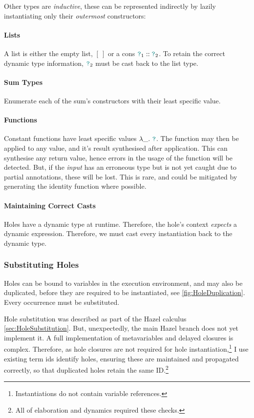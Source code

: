 Other types are \textit{inductive}, these can be represented indirectly by lazily instantiating only their \textit{outermost} constructors: 
 
\paragraph{Lists} A list is either the empty list, $[\ ]$ or a cons ${\color{teal}\texttt{?}}_1 :: {\color{teal}\texttt{?}}_2$. To retain the correct dynamic type information, ${\color{teal}\texttt{?}}_2$ must be cast back to the list type. 
\paragraph{Sum Types} Enumerate each of the sum's constructors with their least specific value.
\paragraph{Functions} Constant functions have least specific values $\lambda \_.\ {\color{teal}\texttt{?}}$. The function may then be applied to any value, and it's result synthesised after application. This can synthesise any return value, hence errors in the usage of the function will be detected. But, if the \textit{input} has an erroneous type but is not yet caught due to partial annotations, these will be lost. This is rare, and could be mitigated by generating the identity function where possible.

\paragraph{Maintaining Correct Casts}
Holes have a dynamic type at runtime. Therefore, the hole's context \textit{expects} a dynamic expression. Therefore, we must cast every instantiation back to the dynamic type.

\subsubsection{Substituting Holes}\label{sec:HoleSubstitutionImplementation}
Holes can be bound to variables in the execution environment, and may also be duplicated, before they are required to be instantiated, see \cref{fig:HoleDuplication}. Every occurrence must be substituted.

Hole substitution was described as part of the Hazel calculus \cref{sec:HoleSubstitution}. But, unexpectedly, the main Hazel branch does not yet implement it. A full implementation of metavariables and delayed closures is complex. Therefore, as hole closures are not required for hole instantiation,\footnote{Instantiations do not contain variable references.} I use existing term ids identify holes, ensuring these are maintained and propagated correctly, so that duplicated holes retain the same ID.\footnote{All of elaboration and dynamics required these checks.}

